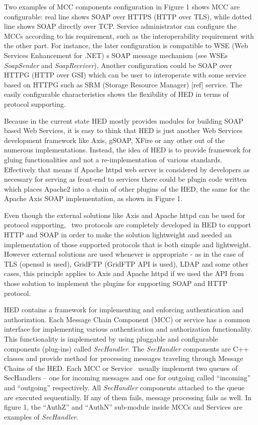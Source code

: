 \documentclass{article}
\begin{document}
Two examples of MCC components configuration in Figure 1 shows MCC are
configurable: real line shows SOAP over HTTPS (HTTP over TLS), while
dotted line shows SOAP directly over TCP. Service administrator can
configure the MCCs according to his requirement, such as the
interoperability requirement with the other part. For instance, the
later configuration is compatible to WSE (Web Services Enhancement for
.NET) {\textquotesingle}s SOAP message mechanism (see
WSE{\textquotesingle}s \textit{SoapSender} and \textit{SoapReceiver}).
Another configuration could be SOAP over HTTPG (HTTP over GSI) which
can be user to interoperate with some service based on HTTPG such as
SRM (Storage Resource Manager) [ref] service. The easily configurable
characteristics shows the flexibility of HED in terms of protocol
supporting.

Because in the current state HED mostly provides modules for building
SOAP based Web Services, it is easy to think that HED is just another
Web Services development framework like Axis, gSOAP, XFire or any other
out of the numerous implementations. Instead, the idea of HED is to
provide framework for gluing functionalities and not a
re-implementation of various standards. Effectively that means if
Apache httpd web server is considered by developers as necessary for
serving as front-end to services there could be plugin code written
which places Apache2 into a chain of other plugins of the HED, the same
for the Apache Axis SOAP implementation, as shown in Figure 1.

Even though the external solutions like Axis and Apache httpd can be
used for protocol supporting, \ two protocols are completely developed
in HED to support HTTP and SOAP in order to make the solution
lightweight and needed an implementation of those supported protocols
that is both simple and lightweight. However external solutions are
used whenever is appropriate - as in the case of TLS (openssl is used),
GridFTP (GridFTP API is used), LDAP and some other cases, this
principle applies to Axis and Apache httpd if we used the API from
those solution to implement the plugins for supporting SOAP and HTTP
protocol. 

HED contains a framework for implementing and enforcing authentication
and authorization. Each Message Chain Component (MCC) or service has a
common interface for implementing various authentication and
authorization functionality. This functionality is implemented by using
pluggable and configurable components (plug-ins) called
\textit{SecHandler}. The \textit{SecHandler} components are C++ classes
and provide method for processing messages traveling through Message
Chains of the HED. Each MCC or Service \ usually implement two queues
of SecHandlers -- one for incoming messages and one for outgoing called
{\textquotedblleft}incoming{\textquotedblright} and
{\textquotedblleft}outgoing{\textquotedblright} respectively. All
\textit{SecHandler} components attached to the queue are executed
sequentially. If any of them fails, message processing fails as well.
In figure 1, the {\textquotedblleft}AuthZ{\textquotedblright} and
{\textquotedblleft}AuthN{\textquotedblright} sub-module inside MCCs and
Services are examples of \textit{SecHandler}.
\end{document}
